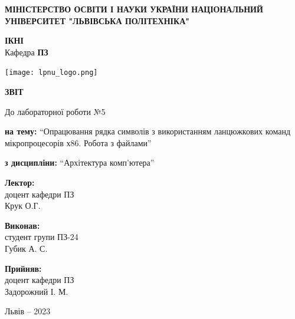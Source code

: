 \documentclass[12pt]{extarticle}
\begin{document}
\begin{titlepage}
    \begin{center}
        \textbf{\normalsize{\MakeUppercase{
            Міністерство Освіти і науки України
            Національний університет "Львівська політехніка"
        }}}

        \begin{flushright}
        \textbf{ІКНІ}\\
        Кафедра \textbf{ПЗ}
        \end{flushright}
        \vspace{15mm}

        \texttt{[image: lpnu\_logo.png]}

        \vspace*{\fill}

        \textbf{\normalsize{\MakeUppercase{Звіт}}}
            
        До лабораторної роботи №5

        \textbf{на тему:} “Опрацювання рядка символів з використанням ланцюжкових
        команд мікропроцесорів х86. Робота з файлами”

        \textbf{з дисципліни:} “Архітектура комп’ютера”
            
        \vspace*{\fill}

        \begin{flushright}

            \textbf{Лектор:}\\
            доцент кафедри ПЗ\\
            Крук О.Г.\\
            \vspace{12pt}

            \textbf{Виконав:}\\
            студент групи ПЗ-24\\
            Губик А. С.\\
            \vspace{12pt}

            \textbf{Прийняв:}\\
            доцент кафедри ПЗ\\
            Задорожний І. М.\\
        \vspace{12pt}
        \end{flushright}

        Львів -- 2023
            
            
    \end{center}
\end{titlepage}
\end{document}
